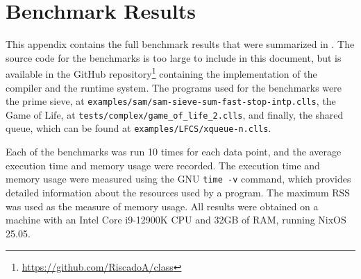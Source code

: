 \chapter{Benchmark Results}
\label{chapter:appendixResults}

This appendix contains the full benchmark results that were summarized in . The source code for the benchmarks is too large to include in this document, but is available in the GitHub repository\footnote{\url{https://github.com/RiscadoA/class}} containing the implementation of the compiler and the runtime system. The programs used for the benchmarks were the prime sieve, at \texttt{examples/sam/sam-sieve-sum-fast-stop-intp.clls}, the Game of Life, at \texttt{tests/complex/game\_of\_life\_2.clls}, and finally, the shared queue, which can be found at \texttt{examples/LFCS/xqueue-n.clls}.

Each of the benchmarks was run 10 times for each data point, and the average execution time and memory usage were recorded. The execution time and memory usage were measured using the GNU \texttt{time -v} command, which provides detailed information about the resources used by a program. The maximum \acf{RSS} was used as the measure of memory usage. All results were obtained on a machine with an Intel Core i9-12900K CPU and 32GB of RAM, running NixOS 25.05.

